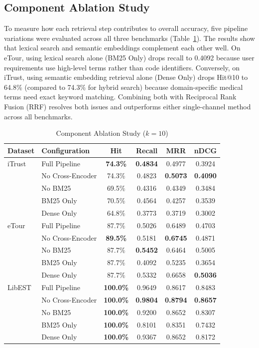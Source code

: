\documentclass[conference]{IEEEtran}
\renewcommand{\arraystretch}{1.15}
\begin{document}
\subsection{Component Ablation Study}

To measure how each retrieval step contributes to overall accuracy, five pipeline variations were evaluated across all three benchmarks (Table~\ref{tab:ablation}). The results show that lexical search and semantic embeddings complement each other well. On eTour, using lexical search alone (BM25 Only) drops recall to 0.4092 because user requirements use high-level terms rather than code identifiers. Conversely, on iTrust, using semantic embedding retrieval alone (Dense Only) drops Hit@10 to 64.8\% (compared to 74.3\% for hybrid search) because domain-specific medical terms need exact keyword matching. Combining both with Reciprocal Rank Fusion (RRF) resolves both issues and outperforms either single-channel method across all benchmarks.

\begin{table}[H]
\centering
\caption{Component Ablation Study ($k=10$)}
\label{tab:ablation}
\footnotesize
\setlength{\tabcolsep}{3.2pt}
\renewcommand{\arraystretch}{1.05}
\begin{tabular}{@{}llcccc@{}}
\toprule
\textbf{Dataset} & \textbf{Configuration} & \textbf{Hit} & \textbf{Recall} & \textbf{MRR} & \textbf{nDCG} \\
\midrule
iTrust & Full Pipeline & \textbf{74.3\%} & \textbf{0.4834} & 0.4977 & 0.3924 \\
 & No Cross-Encoder & 74.3\% & 0.4823 & \textbf{0.5073} & \textbf{0.4090} \\
 & No BM25 & 69.5\% & 0.4316 & 0.4349 & 0.3484 \\
 & BM25 Only & 70.5\% & 0.4564 & 0.4257 & 0.3539 \\
 & Dense Only & 64.8\% & 0.3773 & 0.3719 & 0.3002 \\
\midrule
eTour & Full Pipeline & 87.7\% & 0.5026 & 0.6489 & 0.4703 \\
 & No Cross-Encoder & \textbf{89.5\%} & 0.5181 & \textbf{0.6745} & 0.4871 \\
 & No BM25 & 87.7\% & \textbf{0.5452} & 0.6464 & 0.5005 \\
 & BM25 Only & 87.7\% & 0.4092 & 0.5235 & 0.3654 \\
 & Dense Only & 87.7\% & 0.5332 & 0.6658 & \textbf{0.5036} \\
\midrule
LibEST & Full Pipeline & \textbf{100.0\%} & 0.9649 & 0.8617 & 0.8483 \\
 & No Cross-Encoder & \textbf{100.0\%} & \textbf{0.9804} & \textbf{0.8794} & \textbf{0.8657} \\
 & No BM25 & \textbf{100.0\%} & 0.9200 & 0.8652 & 0.8307 \\
 & BM25 Only & \textbf{100.0\%} & 0.8101 & 0.8351 & 0.7432 \\
 & Dense Only & \textbf{100.0\%} & 0.9367 & 0.8652 & 0.8172 \\
\bottomrule
\end{tabular}
\end{table}
\end{document}
